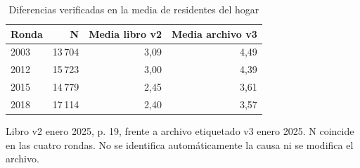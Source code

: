 \begin{table}[!htbp]
\centering
\caption{Diferencias verificadas en la media de residentes del hogar}\label{tab:eda-simple-versiones}
\small\setlength{\tabcolsep}{4pt}
\renewcommand{\arraystretch}{1.15}
\begin{tabular}{lrrr}
\toprule
\textbf{Ronda} & \textbf{N} & \textbf{Media libro v2} & \textbf{Media archivo v3} \\
\midrule
2003 & 13\,704 & 3,09 & 4,49 \\
2012 & 15\,723 & 3,00 & 4,39 \\
2015 & 14\,779 & 2,45 & 3,61 \\
2018 & 17\,114 & 2,40 & 3,57 \\
\bottomrule
\end{tabular}
\par\medskip
\parbox{\linewidth}{\footnotesize Libro v2 enero 2025, p. 19, frente a archivo etiquetado v3 enero 2025. N coincide en las cuatro rondas. No se identifica automáticamente la causa ni se modifica el archivo.}
\end{table}
